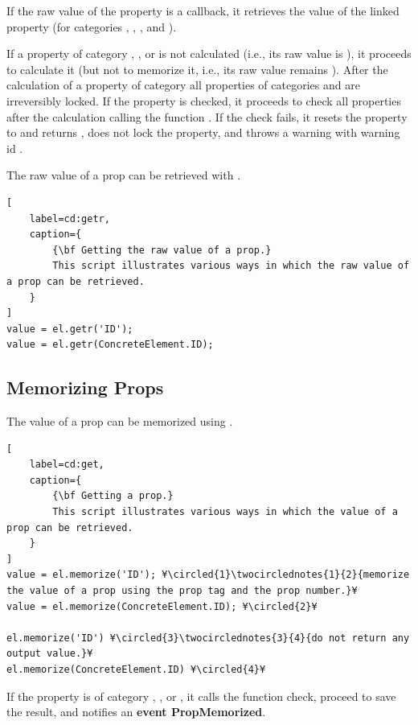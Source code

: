 \documentclass{tufte-handout}
\begin{document}
If the raw value of the property is a callback, it retrieves the value of the linked property (for categories , , , and ).
 
If a property of category , , or  is not calculated (i.e., its raw value is ), it proceeds to calculate it (but not to memorize it, i.e., its raw value remains ). After the calculation of a property of category  all properties of categories  and  are irreversibly locked.
If the property is checked, it proceeds to check all properties after the calculation calling the function . If the check fails, it resets the property to  and returns , does not lock the property, and throws a warning with warning id .

The raw value of a prop can be retrieved with .

\begin{lstlisting}[
	label=cd:getr,
	caption={
		{\bf Getting the raw value of a prop.}
		This script illustrates various ways in which the raw value of a prop can be retrieved.
	}
]
value = el.getr('ID');
value = el.getr(ConcreteElement.ID);
\end{lstlisting}

\subsection{Memorizing Props}  

The value of a prop can be memorized using .

\begin{lstlisting}[
	label=cd:get,
	caption={
		{\bf Getting a prop.}
		This script illustrates various ways in which the value of a prop can be retrieved.
	}
]
value = el.memorize('ID'); ¥\circled{1}\twocirclednotes{1}{2}{memorize the value of a prop using the prop tag and the prop number.}¥
value = el.memorize(ConcreteElement.ID); ¥\circled{2}¥

el.memorize('ID') ¥\circled{3}\twocirclednotes{3}{4}{do not return any output value.}¥
el.memorize(ConcreteElement.ID) ¥\circled{4}¥
\end{lstlisting}

If the property is of category , , or , it calls the function check, proceed to save the result, and notifies an {\bf event PropMemorized}.
\end{document}
